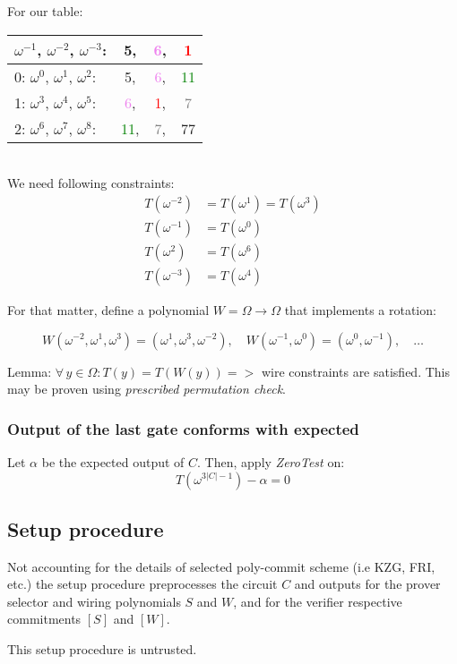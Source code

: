 \documentclass[../lecture-notes.tex]{subfiles}
\begin{document}
\begin{example}
For our table:
\begin{tabular}{l ccc}
  $\omega^{-1}$, $\omega^{-2}$, $\omega^{-3}$: & 5, & \textcolor{violet}{6}, & \textcolor{red}{1} \\ \hline
  0: $\omega^{0}$, $\omega^{1}$, $\omega^{2}$: & 5, & \textcolor{violet}{6}, & \textcolor{green}{11} \\
  1: $\omega^{3}$, $\omega^{4}$, $\omega^{5}$: & \textcolor{violet}{6}, & \textcolor{red}{1}, & \textcolor{gray}{7} \\
  2: $\omega^{6}$, $\omega^{7}$, $\omega^{8}$: & \textcolor{green}{11}, & \textcolor{gray}{7}, & 77 \\ 
\end{tabular}
\\
We need following constraints:
\begin{align}
    T(\omega^{-2}) &= T(\omega^{1}) = T(\omega^{3}) \\
    T(\omega^{-1}) &= T(\omega^{0}) \\
    T(\omega^{2})  &= T(\omega^{6}) \\
    T(\omega^{-3}) &= T(\omega^{4})
\end{align}

For that matter, define a polynomial \(W = \Omega \to \Omega\) that implements a rotation:

\[W(\omega^{-2}, \omega^{1}, \omega^{3}) = (\omega^{1}, \omega^{3}, \omega^{-2}), \quad W(\omega^{-1}, \omega^{0}) = (\omega^{0}, \omega^{-1}), \quad \dots\]

\end{example}

\begin{lemma}
Lemma: \(\forall \, y \in \Omega : T(y) = T(W(y)) =>\) wire constraints are satisfied. This may be proven using \textit{prescribed permutation check}.
\end{lemma}

\subsubsection{Output of the last gate conforms with expected}

Let \(\alpha\) be the expected output of \(C\). Then, apply \textit{ZeroTest} on:
\[T(\omega^{3 |C| - 1}) - \alpha = 0\]

\subsection{Setup procedure}

Not accounting for the details of selected poly-commit scheme (i.e KZG, FRI, etc.) the setup procedure preprocesses the circuit \(C\) and outputs for the prover selector and wiring polynomials \(S\) and \(W\), and for the verifier respective commitments \([S]\) and \([W]\).

\begin{remark}
This setup procedure is untrusted.
\end{remark}
\end{document}
